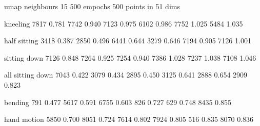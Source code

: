 umap neighbours 15 500 empochs 500 points in 51 dims

kneeling
7817
0.781
7742
0.940
7123
0.975
6102
0.986
7752
1.025
5484
1.035



half sitting
3418
0.387
2850
0.496
6441
0.644
3279
0.646
7194
0.905
7126
1.001

sitting down
7126
0.848
7264
0.925
7254
0.940
7386
1.028
7237
1.038
7108
1.046

all sitting down
7043
0.422
3079
0.434
2895
0.450
3125
0.641
2888
0.654
2909
0.823


bending
791
0.477
5617
0.591
6755
0.603
826
0.727
629
0.748
8435
0.855


hand motion
5850
0.700
8051
0.724
7614
0.802
7924
0.805
516
0.835
8070
0.836
